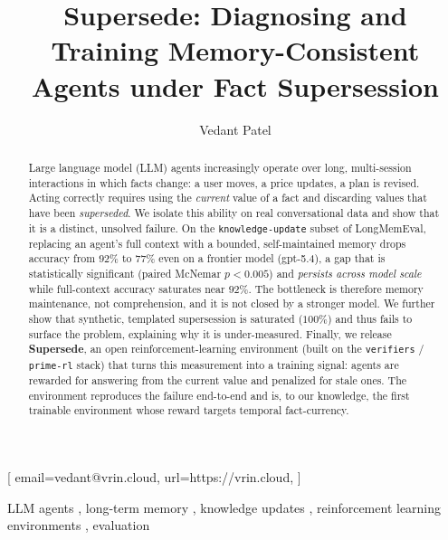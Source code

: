 \documentclass[]{ceurart}
\begin{document}


\title{Supersede: Diagnosing and Training Memory-Consistent Agents under Fact Supersession}

\author[1]{Vedant Patel}[%
email=vedant@vrin.cloud,
url=https://vrin.cloud,
]
\cormark[1]
\address[1]{Vrin (Independent Researcher), United States}


\begin{abstract}
  Large language model (LLM) agents increasingly operate over long,
  multi-session interactions in which facts change: a user moves, a price
  updates, a plan is revised. Acting correctly requires using the
  \emph{current} value of a fact and discarding values that have been
  \emph{superseded}. We isolate this ability on real conversational data and
  show that it is a distinct, unsolved failure. On the
  \texttt{knowledge-update} subset of LongMemEval, replacing an agent's full
  context with a bounded, self-maintained memory drops accuracy from
  $92\%$ to $77\%$ even on a frontier model (gpt-5.4), a gap that is
  statistically significant (paired McNemar $p<0.005$) and \emph{persists
  across model scale} while full-context accuracy saturates near $92\%$. The
  bottleneck is therefore memory maintenance, not comprehension, and it is not
  closed by a stronger model. We further show that synthetic, templated
  supersession is saturated ($100\%$) and thus fails to surface the problem,
  explaining why it is under-measured. Finally, we release \textbf{Supersede},
  an open reinforcement-learning environment (built on the \texttt{verifiers}
  /\,\texttt{prime-rl} stack) that turns this measurement into a training
  signal: agents are rewarded for answering from the current value and
  penalized for stale ones. The environment reproduces the failure
  end-to-end and is, to our knowledge, the first trainable environment whose
  reward targets temporal fact-currency.
\end{abstract}

\begin{keywords}
  LLM agents \sep
  long-term memory \sep
  knowledge updates \sep
  reinforcement learning environments \sep
  evaluation
\end{keywords}
\end{document}
